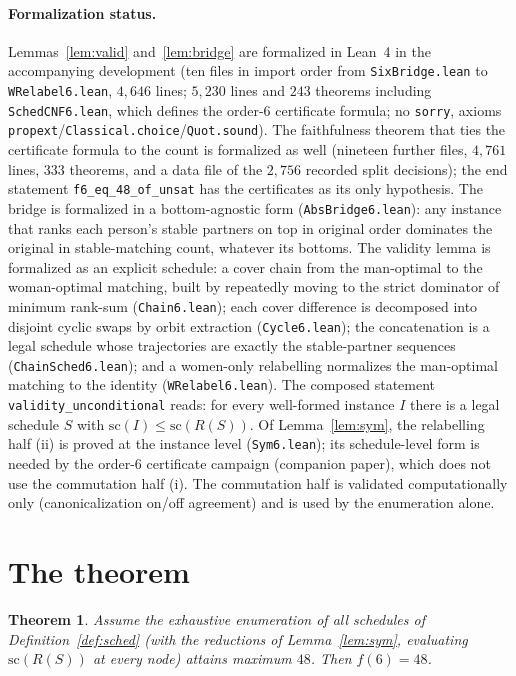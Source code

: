 \documentclass[11pt]{article}
\newtheorem{theorem}{Theorem}
\begin{document}
\paragraph{Formalization status.} Lemmas~\ref{lem:valid} and~\ref{lem:bridge} are
formalized in Lean~4 in the accompanying development (ten files in import order from
\texttt{SixBridge.lean} to \texttt{WRelabel6.lean}, $4{,}646$ lines; $5{,}230$ lines and
$243$ theorems including \texttt{SchedCNF6.lean}, which defines the order-6 certificate
formula; no \texttt{sorry}, axioms
\texttt{propext}/\texttt{Classical.choice}/\texttt{Quot.sound}). The faithfulness theorem
that ties the certificate formula to the count is formalized as well (nineteen further files,
$4{,}761$ lines, $333$ theorems, and a data file of the $2{,}756$ recorded split decisions);
the end statement \texttt{f6\_eq\_48\_of\_unsat} has the certificates as its only hypothesis.
The bridge is formalized in a bottom-agnostic form (\texttt{AbsBridge6.lean}): any
instance that ranks each person's stable partners on top in original order dominates
the original in stable-matching count, whatever its bottoms. The validity lemma is
formalized as an explicit schedule: a cover chain from the man-optimal to the
woman-optimal matching, built by repeatedly moving to the strict dominator of minimum
rank-sum (\texttt{Chain6.lean}); each cover difference is decomposed into disjoint cyclic
swaps by orbit extraction (\texttt{Cycle6.lean}); the concatenation is a legal schedule
whose trajectories are exactly the stable-partner sequences
(\texttt{ChainSched6.lean}); and a women-only relabelling normalizes the man-optimal
matching to the identity (\texttt{WRelabel6.lean}). The composed statement
\texttt{validity\_unconditional} reads: for every well-formed instance $I$ there is a
legal schedule $S$ with $\mathrm{sc}(I)\le\mathrm{sc}(R(S))$.
Of Lemma~\ref{lem:sym}, the relabelling half (ii) is proved at the instance level
(\texttt{Sym6.lean}); its schedule-level form is needed by the order-6 certificate
campaign (companion paper), which does not use the commutation half (i). The commutation
half is validated computationally only (canonicalization on/off agreement) and is used by
the enumeration alone.

\section{The theorem}

\begin{theorem}\label{thm:f6}
Assume the exhaustive enumeration of all schedules of Definition~\ref{def:sched}
(with the reductions of Lemma~\ref{lem:sym}, evaluating
$\mathrm{sc}(R(S))$ at every node) attains maximum $48$. Then $f(6)=48$.
\end{theorem}
\end{document}
